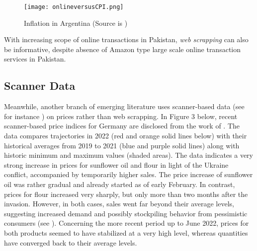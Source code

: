 \documentclass[12pt]{article}
\newcommand{\1}{\mathbbm 1}
\begin{document}
		
		
		
		
		
		
		
		
		
		
		
		
		
		
		
		
		
		
		
		\begin{figure}[H]
			\begin{Center}
				\texttt{[image: onlineversusCPI.png]}
				\caption{Inflation in Argentina (Source is \cite{cavallo2016billion})}
			\end{Center}
		\end{figure}
		
		
		With increasing scope of online transactions in Pakistan, \textit{web scrapping} can also be informative, despite absence of Amazon type large scale online transaction services in Pakistan.
		
		\subsection{Scanner Data}
		
		
		
		Meanwhile, another branch of emerging literature uses scanner-based data (see for instance \cite{beck2020price}) on prices rather than web scrapping. In Figure 3 below, recent scanner-based price indices for Germany are disclosed from the work of \cite{beck2022}. The data compares trajectories in 2022 (red and orange solid lines below) with their historical averages from 2019 to 2021 (blue and purple solid lines) along with historic minimum and maximum values (shaded areas). The data indicates a very strong increase in prices for sunflower oil and flour in light of the Ukraine conflict, accompanied by temporarily higher sales. The price increase of sunflower oil was rather gradual and already started as of early February. In contrast, prices for flour increased very sharply, but only more than two months after the invasion. However, in both cases, sales went far beyond their average levels, suggesting increased demand and possibly stockpiling behavior from pessimistic consumers (see \cite{cavallo2021can}). Concerning the more recent period up to June 2022, prices for both products seemed to have stabilized at a very high level, whereas quantities have converged back to their average levels.
		
		
\end{document}

